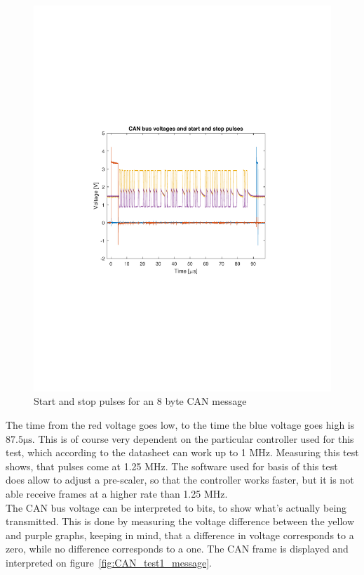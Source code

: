 \begin{figure}[h]
	\centering
	\includegraphics[width = \linewidth]{graphics/CAN_test1_raw}
	\caption{Start and stop pulses for an 8 byte CAN message}
	\label{fig:CAN_test1_raw}
\end{figure}

The time from the red voltage goes low, to the time the blue voltage goes high is $87.5 \si{\micro\second}$.
This is of course very dependent on the particular controller used for this test, which according to the datasheet can work up to 1 MHz.
Measuring this test shows, that pulses come at 1.25 MHz.
The software used for basis of this test does allow to adjust a pre-scaler, so that the controller works faster, but it is not able receive frames at a higher rate than 1.25 MHz.\\

The CAN bus voltage can be interpreted to bits, to show what's actually being transmitted.
This is done by measuring the voltage difference between the yellow and purple graphs, keeping in mind, that a difference in voltage corresponds to a zero, while no difference corresponds to a one.
The CAN frame is displayed and interpreted on figure~\ref{fig:CAN_test1_message}.

